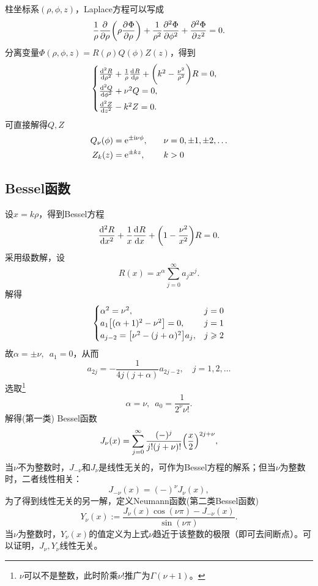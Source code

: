 柱坐标系$(\rho,\phi,z)$，Laplace方程可以写成
\begin{equation}
    \label{eqn:Laplace in cylinder}
    \frac1\rho\pp\rho\biggkh{\rho\pv\Phi\rho}+\frac1{\rho^2}\pv[2]\Phi\phi+\pv[2]\Phi z=0.
\end{equation}
分离变量$\Phi(\rho,\phi,z)=R(\rho)Q(\phi)Z(z)$，得到 
\[
    \begin{cases}
        \dv[2]R\rho+\frac1\rho\dv R\rho+\biggkh{k^2-\frac{\nu^2}{\rho^2}}R=0,\\[1ex]
        \dv[2]Q\phi+\nu^2Q=0,\\[1ex]
        \dv[2]Zz-k^2Z=0.
    \end{cases}
\]
可直接解得$Q,Z$
\begin{alignat}{2}
    Q_\nu(\phi)&=\e{\pm\i\nu\phi},\quad&\nu&=0,\pm 1,\pm 2,\ldots\\
    Z_k(z)&=\e{\pm kz},&k&>0
\end{alignat}

\subsection{Bessel函数}
\label{ssec:Bessel functions}

设$x=k\rho$，得到Bessel方程
\begin{equation}
    \label{eqn:Bessel eqn}
    \dv[2]Rx+\frac1x\dv Rx+\biggkh{1-\frac{\nu^2}{x^2}}R=0.
\end{equation}
采用级数解，设 
\[
    R(x)=x^\alpha\sum_{j=0}^\infty a_jx^j.
\]
解得
\[
    \begin{cases}
        \alpha^2=\nu^2,&j=0\\
        a_1\bigfkh{(\alpha+1)^2-\nu^2}=0,&j=1\\
        a_{j-2}=\bigfkh{\nu^2-(j+\alpha)^2}a_j,&j\geqslant 2
    \end{cases}
\]
故$\alpha=\pm\nu,\enspace a_1=0$，从而
\[
    a_{2j}=-\frac1{4j(j+\alpha)}a_{2j-2},\quad j=1,2,\ldots
\]
选取\footnote{$\nu$可以不是整数，此时阶乘$\nu!$推广为$\Gamma(\nu+1)$。}
\[
    \alpha=\nu,\enspace a_0=\frac1{2^\nu\nu!}.
\]
解得(第一类) Bessel函数
\begin{equation}
    J_\nu(x)=\sum_{j=0}^\infty\frac{(-)^j}{j!(j+\nu)!}\Bigkh{\frac x2}^{2j+\nu},
\end{equation}
当$\nu$不为整数时，$J_{-\nu}$和$J_\nu$是线性无关的，可作为Bessel方程的解系；但当$\nu$为整数时，二者线性相关：
\[
    J_{-\nu}(x)=(-)^\nu J_\nu(x),
\]
为了得到线性无关的另一解，定义Neumann函数(第二类Bessel函数)
\begin{equation}
    Y_\nu(x):=\frac{J_\nu(x)\cos(\nu\pi)-J_{-\nu}(x)}{\sin(\nu\pi)}.
\end{equation}
当$\nu$为整数时，$Y_\nu(x)$的值定义为上式$\nu$趋近于该整数的极限（即可去间断点）。可以证明，$J_\nu,Y_\nu$线性无关。

